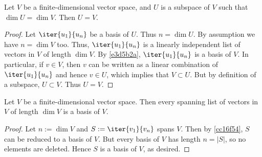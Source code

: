 \label{ed8951d}

Let $V$ be a finite-dimensional vector space, and $U$ is a subspace of $V$ such
that $\dim U=\dim V$. Then $U=V$.

\begin{proof}
  Let $\iter{u_1}{u_n}$ be a basis of $U$. Thus $n=\dim U$. By assumption we
  have $n=\dim V$ too. Thus, $\iter{u_1}{u_n}$ is a linearly independent list of
  vectors in $V$ of length $\dim V$. By \autoref{e3d5b2a}, $\iter{u_1}{u_n}$ is
  a basis of $V$. In particular, if $v\in V$, then $v$ can be written as a
  linear combination of $\iter{u_1}{u_n}$ and hence $v\in U$, which implies that
  $V\subset U$. But by definition of a subspace, $U\subset V$. Thus $U=V$.
\end{proof}

\label{c1df707}

Let $V$ be a finite-dimensional vector space. Then every spanning list of
vectors in $V$ of length $\dim V$ is a basis of $V$.

\begin{proof}
  Let $n:=\dim V$ and $S:=\iter{v_1}{v_n}$ spans $V$. Then by \autoref{cc16f54},
  $S$ can be reduced to a basis of $V$. But every basis of $V$ has length
  $n=|S|$, so no elements are deleted. Hence $S$ is a basis of $V$, as desired.
\end{proof}
